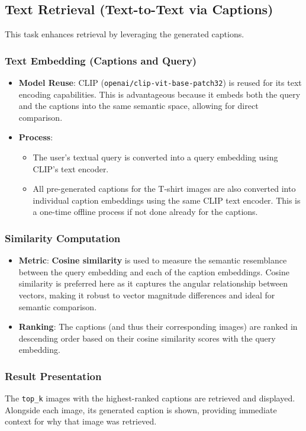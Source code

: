\documentclass{article}
\begin{document}
\subsection{Text Retrieval (Text-to-Text via Captions)}
This task enhances retrieval by leveraging the generated captions.

\subsubsection{Text Embedding (Captions and Query)}
\begin{itemize}
    \item \textbf{Model Reuse}: CLIP (\texttt{openai/clip-vit-base-patch32}) is reused for its text encoding capabilities. This is advantageous because it embeds both the query and the captions into the same semantic space, allowing for direct comparison.
    \item \textbf{Process}:
    \begin{itemize}
        \item The user's textual query is converted into a query embedding using CLIP's text encoder.
        \item All pre-generated captions for the T-shirt images are also converted into individual caption embeddings using the same CLIP text encoder. This is a one-time offline process if not done already for the captions.
    \end{itemize}
\end{itemize}

\subsubsection{Similarity Computation}
\begin{itemize}
    \item \textbf{Metric}: \textbf{Cosine similarity} is used to measure the semantic resemblance between the query embedding and each of the caption embeddings. Cosine similarity is preferred here as it captures the angular relationship between vectors, making it robust to vector magnitude differences and ideal for semantic comparison.
    \item \textbf{Ranking}: The captions (and thus their corresponding images) are ranked in descending order based on their cosine similarity scores with the query embedding.
\end{itemize}

\subsubsection{Result Presentation}
The \texttt{top\_k} images with the highest-ranked captions are retrieved and displayed. Alongside each image, its generated caption is shown, providing immediate context for why that image was retrieved.
\end{document}
